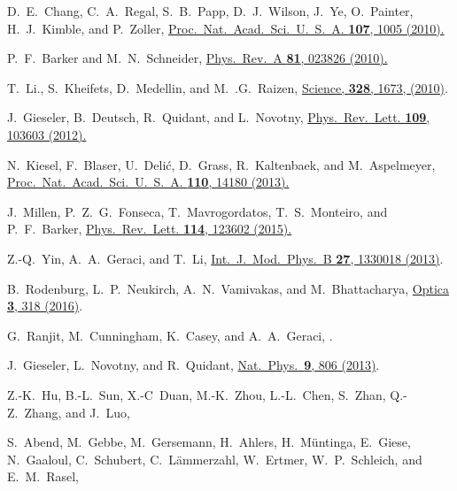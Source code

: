 \documentclass[twocolumn,superscriptaddress,floatfix,preprintnumbers,prl]{revtex4}
\begin{document}
\begin{thebibliography}{27}
D.~E.~Chang, C.~A.~Regal, S.~B.~Papp, D.~J.~Wilson, J.~Ye, O.~Painter, H.~J.~Kimble, and P.~Zoller, \href{http://www.pnas.org/content/107/3/1005}{Proc.~Nat.~Acad.~Sci.~U.~S.~A. {\bf 107}, 1005 (2010).}

P.~F.~Barker and M.~N.~Schneider, \href{http://journals.aps.org/pra/abstract/10.1103/PhysRevA.81.023826}{Phys.~Rev.~A {\bf 81}, 023826 (2010).}

T.~Li., S.~Kheifets, D.~Medellin, and M.~.G.~Raizen, \href{http://dx.doi.org/10.1126/science.1189403}{Science, {\bf 328}, 1673, (2010)}.

J.~Gieseler, B.~Deutsch, R.~Quidant, and L.~Novotny, \href{http://journals.aps.org/prl/abstract/10.1103/PhysRevLett.109.103603}{Phys.~Rev.~Lett. {\bf 109}, 103603 (2012).}

N.~Kiesel, F.~Blaser, U.~Deli\'c, D.~Grass, R.~Kaltenbaek, and M.~Aspelmeyer, \href{http://www.pnas.org/content/110/35/14180.abstract}{Proc.~Nat.~Acad.~Sci.~U.~S.~A. {\bf 110}, 14180 (2013).}

J.~Millen, P.~Z.~G.~Fonseca, T.~Mavrogordatos, T.~S.~Monteiro, and P.~F.~Barker, \href{http://journals.aps.org/prl/abstract/10.1103/PhysRevLett.114.123602}{Phys.~Rev.~Lett. {\bf 114}, 123602 (2015).}

Z.-Q.~Yin, A.~A.~Geraci, and T.~Li, \href{http://www.worldscientific.com/doi/abs/10.1142/S0217979213300181}{Int.~J.~Mod.~Phys.~B {\bf 27}, 1330018 (2013)}.


B.~Rodenburg, L.~P.~Neukirch, A.~N.~Vamivakas, and M.~Bhattacharya, \href{https://www.osapublishing.org/optica/abstract.cfm?uri=optica-3-3-318}{Optica {\bf 3}, 318 (2016)}.


G.~Ranjit, M.~Cunningham, K.~Casey, and A.~A.~Geraci, \href{http://journals.aps.org/pra/abstract/10.1103/PhysRevA.93.053801}{}.

J.~Gieseler, L.~Novotny, and R.~Quidant, \href{http://www.nature.com/nphys/journal/v9/n12/full/nphys2798.html}{Nat.~Phys.~{\bf 9}, 806 (2013)}.


Z.-K.~Hu, B.-L.~Sun, X.-C~Duan, M.-K.~Zhou, L.-L.~Chen, S.~Zhan, Q.-Z.~Zhang, and J.~Luo, \href{http://journals.aps.org/pra/abstract/10.1103/PhysRevA.88.043610}{}

S.~Abend, M.~Gebbe, M.~Gersemann, H.~Ahlers, H.~M\"untinga, E.~Giese, N.~Gaaloul, C.~Schubert, C.~L\"ammerzahl, W.~Ertmer, W.~P.~Schleich, and E.~M.~Rasel, \href{http://journals.aps.org/prl/abstract/10.1103/PhysRevLett.117.203003}{}


\end{thebibliography}
\end{document}

